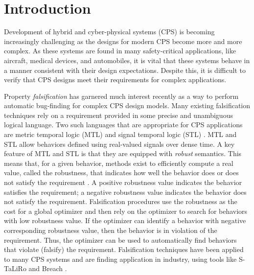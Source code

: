 \section{Introduction} \label{sec:introduction}

Development of hybrid and cyber-physical systems (CPS) is becoming
increasingly challenging as the designs for modern CPS become more and
more complex.  As these systems are found in many safety-critical
applications, like aircraft, medical devices, and automobiles, it is
vital that these systems behave in a manner consistent with their
design expectations. Despite this, it is difficult to verify that CPS
designs meet their requirements for complex applications.


Property \emph{falsification} has garnered much interest recently as a
way to perform automatic bug-finding for complex CPS design
models. Many existing falsification techniques rely on a requirement
provided in some precise and unambiguous logical language. Two such
languages that are appropriate for CPS applications are metric
temporal logic (MTL) and signal temporal logic (STL)
\cite{Koymans1990,MalerN04}. MTL and STL allow behaviors defined
using real-valued signals over dense time. A key feature of MTL and
STL is that they are equipped with \emph{robust} semantics. This means
that, for a given behavior, methods exist to efficiently compute a
real value, called the robustness, that indicates how well the
behavior does or does not satisfy the requirement
\cite{FainekosP06fates,DonzeM10}. A positive robustness value
indicates the behavior satisfies the requirement; a negative
robustness value indicates the behavior does not satisfy the
requirement. Falsification procedures use the robustness as the cost
for a global optimizer and then rely on the optimizer to search for
behaviors with low robustness value. If the optimizer can identify a
behavior with negative corresponding robustness value, then the
behavior is in violation of the requirement. Thus, the optimizer can
be used to automatically find behaviors that violate (falsify) the
requirement. Falsification techniques have been applied to many CPS
systems and are finding application in industry, using tools like
S-TaLiRo and Breach \cite{TaliroLFS11,BreachCAV10}.

